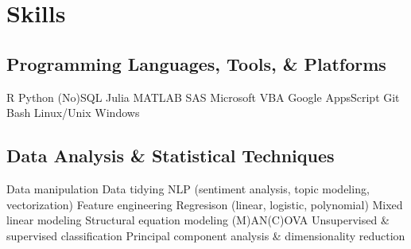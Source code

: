 \documentclass[letterpaper]{deedy-resume_sm} %
\begin{document}

\section{Skills}
\subsection{Programming Languages, Tools, \& Platforms}
R \textbullet{} Python \textbullet{} (No)SQL \textbullet{} Julia \textbullet{} MATLAB \textbullet{} SAS \textbullet{} Microsoft VBA \textbullet{} Google AppsScript \textbullet{} Git \textbullet{} Bash \textbullet{} Linux/Unix \textbullet{} Windows
\subsection{Data Analysis \& Statistical Techniques}
Data manipulation \textbullet{} Data tidying \textbullet{} NLP (sentiment analysis, topic modeling, vectorization) \textbullet{} Feature engineering \textbullet{} Regresison (linear, logistic, polynomial) \textbullet{} Mixed linear modeling \textbullet{} Structural equation modeling \textbullet{} (M)AN(C)OVA \textbullet{} Unsupervised \& supervised classification \textbullet{} Principal component analysis \& dimensionality reduction\\
\end{document}
